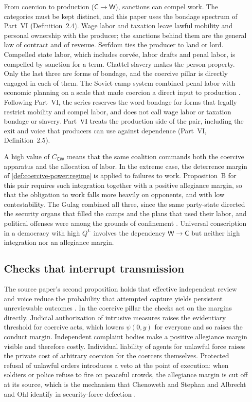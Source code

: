 \documentclass[11pt,letterpaper]{article}
\theoremstyle{definition}
\theoremstyle{remark}
\newcommand{\pC}{\mathsf{C}}
\newcommand{\pW}{\mathsf{W}}
\begin{document}
From coercion to production ($\pC \to \pW$), sanctions can compel work. The categories must be kept distinct, and this paper uses the bondage spectrum of Part~VI (Definition~2.4). Wage labor and taxation leave lawful mobility and personal ownership with the producer; the sanctions behind them are the general law of contract and of revenue. Serfdom ties the producer to land or lord. Compelled state labor, which includes corv\'ee, labor drafts and penal labor, is compelled by sanction for a term. Chattel slavery makes the person property. Only the last three are forms of bondage, and the coercive pillar is directly engaged in each of them. The Soviet camp system combined penal labor with economic planning on a scale that made coercion a direct input to production \citep{applebaum2003,gregory2003}. Following Part~VI, the series reserves the word bondage for forms that legally restrict mobility and compel labor, and does not call wage labor or taxation bondage or slavery. Part~VI treats the production side of the pair, including the exit and voice that producers can use against dependence (Part~VI, Definition~2.5).

A high value of $C_{\pC\pW}$ means that the same coalition commands both the coercive apparatus and the allocation of labor. In the extreme case, the deterrence margin of \cref{def:coercive-power:regime} is applied to failures to work. Proposition~B for this pair requires such integration together with a positive allegiance margin, so that the obligation to work falls more heavily on opponents, and with low contestability. The Gulag combined all three, since the same party-state directed the security organs that filled the camps and the plans that used their labor, and political offenses were among the grounds of confinement \citep{applebaum2003}. Universal conscription in a democracy with high $Q^{\pC}$ involves the dependency $\pW \to \pC$ but neither high integration nor an allegiance margin.

\subsection{Checks that interrupt transmission}

The source paper's second proposition holds that effective independent review and voice reduce the probability that attempted capture yields persistent unreviewable outcomes \citep{largo2026hbs}. In the coercive pillar the checks act on the margins directly. Judicial authorization of intrusive measures raises the evidentiary threshold for coercive acts, which lowers $\psi(0,y)$ for everyone and so raises the conduct margin. Independent complaint bodies make a positive allegiance margin visible and therefore costly. Individual liability of agents for unlawful force raises the private cost of arbitrary coercion for the coercers themselves. Protected refusal of unlawful orders introduces a veto at the point of execution: when soldiers or police refuse to fire on peaceful crowds, the allegiance margin is cut off at its source, which is the mechanism that Chenoweth and Stephan and Albrecht and Ohl identify in security-force defection \citep{chenoweth2011,albrecht2016}.
\end{document}
